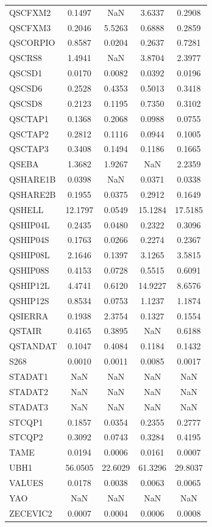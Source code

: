 \begin{longtable}{lcccc}
QSCFXM2  &   0.1497 &      NaN &   3.6337 &   0.2908 \\
QSCFXM3  &   0.2046 &   5.5263 &   0.6888 &   0.2859 \\
QSCORPIO &   0.8587 &   0.0204 &   0.2637 &   0.7281 \\
QSCRS8   &   1.4941 &      NaN &   3.8704 &   2.3977 \\
QSCSD1   &   0.0170 &   0.0082 &   0.0392 &   0.0196 \\
QSCSD6   &   0.2528 &   0.4353 &   0.5013 &   0.3418 \\
QSCSD8   &   0.2123 &   0.1195 &   0.7350 &   0.3102 \\
QSCTAP1  &   0.1368 &   0.2068 &   0.0988 &   0.0755 \\
QSCTAP2  &   0.2812 &   0.1116 &   0.0944 &   0.1005 \\
QSCTAP3  &   0.3408 &   0.1494 &   0.1186 &   0.1665 \\
QSEBA    &   1.3682 &   1.9267 &      NaN &   2.2359 \\
QSHARE1B &   0.0398 &      NaN &   0.0371 &   0.0338 \\
QSHARE2B &   0.1955 &   0.0375 &   0.2912 &   0.1649 \\
QSHELL   &  12.1797 &   0.0549 &  15.1284 &  17.5185 \\
QSHIP04L &   0.2435 &   0.0480 &   0.2322 &   0.3096 \\
QSHIP04S &   0.1763 &   0.0266 &   0.2274 &   0.2367 \\
QSHIP08L &   2.1646 &   0.1397 &   3.1265 &   3.5815 \\
QSHIP08S &   0.4153 &   0.0728 &   0.5515 &   0.6091 \\
QSHIP12L &   4.4741 &   0.6120 &  14.9227 &   8.6576 \\
QSHIP12S &   0.8534 &   0.0753 &   1.1237 &   1.1874 \\
QSIERRA  &   0.1938 &   2.3754 &   0.1327 &   0.1554 \\
QSTAIR   &   0.4165 &   0.3895 &      NaN &   0.6188 \\
QSTANDAT &   0.1047 &   0.4084 &   0.1184 &   0.1432 \\
S268     &   0.0010 &   0.0011 &   0.0085 &   0.0017 \\
STADAT1  &      NaN &      NaN &      NaN &      NaN \\
STADAT2  &      NaN &      NaN &      NaN &      NaN \\
STADAT3  &      NaN &      NaN &      NaN &      NaN \\
STCQP1   &   0.1857 &   0.0354 &   0.2355 &   0.2777 \\
STCQP2   &   0.3092 &   0.0743 &   0.3284 &   0.4195 \\
TAME     &   0.0194 &   0.0006 &   0.0161 &   0.0007 \\
UBH1     &  56.0505 &  22.6029 &  61.3296 &  29.8037 \\
VALUES   &   0.0178 &   0.0038 &   0.0063 &   0.0065 \\
YAO      &      NaN &      NaN &      NaN &      NaN \\
ZECEVIC2 &   0.0007 &   0.0004 &   0.0006 &   0.0008 \\
\end{longtable}
